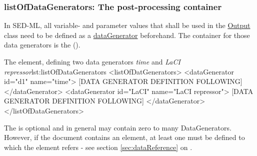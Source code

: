  \subsubsection{listOfDataGenerators: The post-processing container}
\label{sec:listOfDataGenerators}

In SED-ML, all variable- and parameter values that shall be used in the \hyperref[class:output]{Output} class need to be defined as a \hyperref[class:dataGenerator]{dataGenerator} beforehand. The container for those data generators is the  (). 
%

%
\begin{myXmlLst}{The  element, defining two data generators \emph{time} and \emph{LaCI repressor}}{lst:listOfDataGenerators}
<listOfDatGenerators>
 <dataGenerator id="d1" name="time">
  [DATA GENERATOR DEFINITION FOLLOWING]
 </dataGenerator>
 <dataGenerator id="LaCI" name="LaCI repressor">
  [DATA GENERATOR DEFINITION FOLLOWING]
 </dataGenerator>
</listOfDataGenerators>
\end{myXmlLst}

The  is optional and in general may contain zero to many DataGenerators. However, if the \LoneVtwo document contains  an    element, at least one   must be defined to which the  element refers -  see  section \ref{sec:dataReference} on .
%



